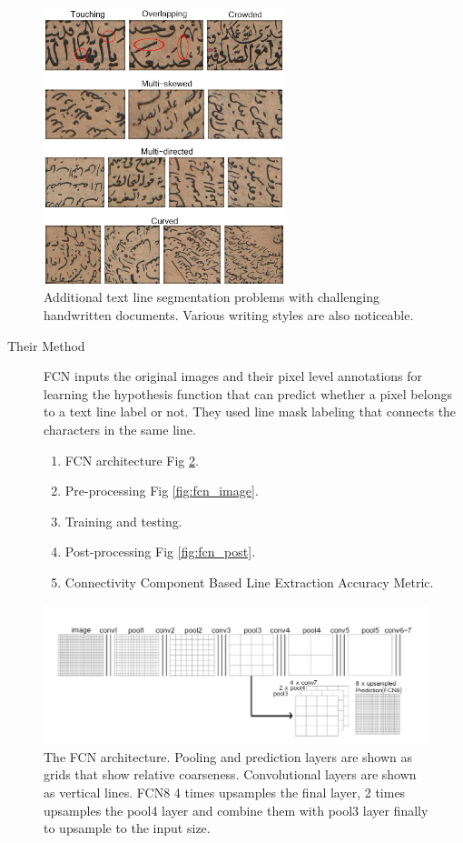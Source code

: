 \begin{figure}[!htb]
    \centering
    \includegraphics[width=7cm]{images/text line segmentation problems.jpg}
    \caption{Additional text line segmentation problems with challenging handwritten documents. Various writing styles are also noticeable.}
    \label{fig:text line problems}
\end{figure}

\begin{description}
  \item[Their Method] FCN inputs the original images and their pixel level annotations for learning the hypothesis function that can predict whether a pixel belongs to a text line label or not. They used line mask labeling that connects the characters in the same line.
   
  \begin{enumerate}
  \item FCN architecture Fig \ref{fig:fcn_arc}.
  \item Pre-processing Fig \ref{fig:fcn_image}.
  \item Training and testing.
  \item Post-processing Fig \ref{fig:fcn_post}.
  \item Connectivity Component Based Line Extraction Accuracy Metric.
\end{enumerate}
\end{description}


\begin{figure}[!htb]
    \centering
    \includegraphics[width=15cm]{images/FCN_arc.png}
    \caption{The FCN architecture. Pooling and prediction layers are shown as grids that show relative coarseness. Convolutional layers are shown as vertical lines. FCN8 4 times upsamples the final layer, 2 times upsamples the pool4 layer and combine them with pool3 layer finally to upsample to the input size.}
    \label{fig:fcn_arc}
\end{figure}

